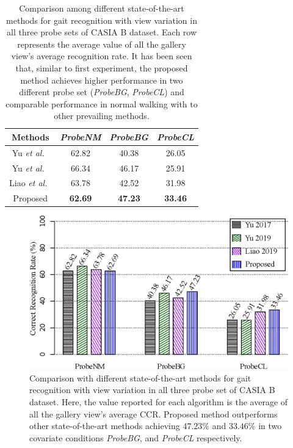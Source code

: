 \begin{table}
	\centering
	\caption{Comparison among different state-of-the-art methods for gait recognition with view variation in all three probe sets of CASIA B dataset.  Each row represents the average value of all the gallery view's average recognition rate. It has been seen that, similar to first experiment, the proposed method achieves higher performance in two different probe set (\textit{ProbeBG}, \textit{ProbeCL}) and comparable performance in normal walking with to other prevailing methods. \label{table:comp_casia_b_with_view}}
		
	{\begin{tabular*}{25pc}{cccc}\hline
				
				Methods &\textit{ProbeNM} &\textit{ProbeBG} &\textit{ProbeCL}\\
				\hline
				
				\noalign{\smallskip}
				Yu \textit{et al.}~\cite{Yu_17_space} &62.82 &40.38 &26.05 \\ 
				
				
				\noalign{\smallskip}
				Yu \textit{et al.}~\cite{Yu_19} &66.34  &46.17  &25.91  \\
				
				\noalign{\smallskip}
				Liao \textit{et al.}~\cite{Liao_19}  &63.78  &42.52  &31.98  \\
				
				\noalign{\smallskip}
				Proposed &\textbf{62.69} &\textbf{47.23} &\textbf{33.46}\\
				\hline
\end{tabular*}}{}
\end{table}

\begin{figure}
	\centering
	\includegraphics[width = 115mm]{figures/comp_casia_b_with_view.eps}
	\caption{
		Comparison with different state-of-the-art methods for gait recognition with view variation in all three probe set of CASIA B dataset. Here, the value reported for each algorithm is the average of all the gallery view's average CCR. Proposed method outperforms other state-of-the-art methods achieving $47.23\%$ and $33.46\%$ in two covariate conditions \textit{ProbeBG}, and \textit{ProbeCL} respectively.  
	}
	\label{fig:comp_casia_b_with_view}
\end{figure}




